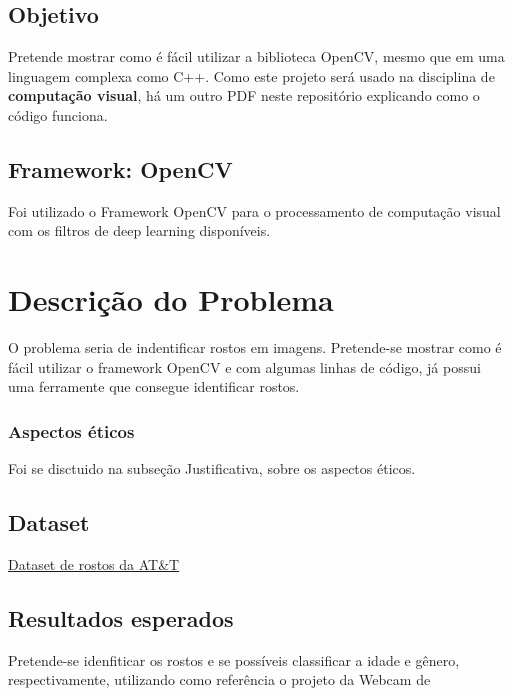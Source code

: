 \documentclass{article}
\begin{document}
\subsection{Objetivo}
Pretende mostrar como é fácil utilizar a biblioteca OpenCV, mesmo que em uma linguagem complexa como C++. Como este projeto será usado na disciplina de \textbf{computação visual}, há um outro PDF neste repositório explicando como o código funciona.
\subsection{Framework: OpenCV}
Foi utilizado o Framework OpenCV para o processamento de computação visual com os filtros de deep learning disponíveis.
\section{Descrição do Problema}
O problema seria de indentificar rostos em imagens. Pretende-se mostrar como é fácil utilizar o framework OpenCV e com algumas linhas de código, já possui uma ferramente que consegue identificar rostos.
\subsubsection{Aspectos éticos}
Foi se disctuido na subseção Justificativa, sobre os aspectos éticos.
\subsection{Dataset}
\href{https://www.kaggle.com/datasets/kasikrit/att-database-of-faces} {Dataset de rostos da AT\&T}
\subsection{Resultados esperados}
Pretende-se idenfiticar os rostos e se possíveis classificar a idade e gênero, respectivamente, utilizando como referência o projeto da Webcam de \cite{cvbookpakt}
\printbibliography
\newpage
\end{document}
